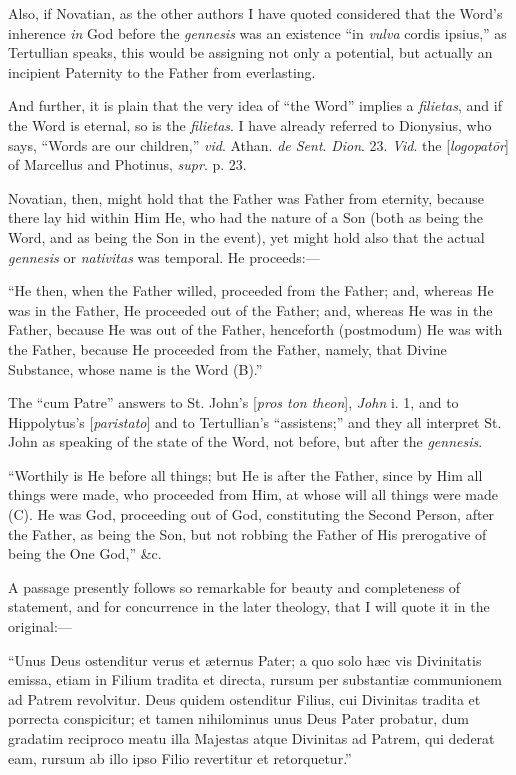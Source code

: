 Also, if Novatian, as the other authors I have quoted considered
that the Word's inherence \emph{in} God before the \emph{gennesis} was
an existence ``in \emph{vulva} cordis ipsius,'' as Tertullian
speaks, this would be assigning not only a potential, but actually an
incipient Paternity to the Father from everlasting.

And further, it is plain that the very idea of ``the Word''
implies a \emph{filietas}, and if the Word is eternal, so is the \emph{filietas}.
I have already referred to Dionysius, who says, ``Words are our
children,'' \emph{vid}. Athan. \emph{de Sent}. \emph{Dion}. 23. \emph{Vid}.
the [\emph{logopat\={o}r}] of Marcellus and Photinus, \emph{supr}.
p. 23.

Novatian, then, might hold that the Father was Father from
eternity, because there lay hid within Him He, who had the nature of a
Son (both as being the Word, and as being the Son in the event), yet
might hold also that the actual \emph{gennesis} or \emph{nativitas}
was temporal. He proceeds:—

``He then, when the Father willed, proceeded from the Father;
and, whereas He was in the Father, He proceeded out of the Father;
and, whereas He was in the Father, because He was out of the Father,
henceforth (postmodum) He was with the Father, because He proceeded
from the Father, namely, that Divine Substance, whose name is the Word
(B).''

The ``cum Patre'' answers to St. John's [\emph{pros ton theon}],
\emph{John} i. 1, and to Hippolytus's [\emph{paristato}] and to
Tertullian's ``assistens;'' and they all interpret St. John as
speaking of the state of the Word, not before, but after the \emph{gennesis}.

``Worthily is He before all things; but He is after the Father,
since by Him all things were made, who proceeded from Him, at whose
will all things were made (C). He was God, proceeding out of God,
constituting the Second Person, after the Father, as being the Son,
but not robbing the Father of His prerogative of being the One
God,'' \&c.

A passage presently follows so remarkable for beauty and
completeness of statement, and for concurrence in the later theology,
that I will quote it in the original:—

``Unus Deus ostenditur verus et æternus Pater; a quo solo hæc
vis Divinitatis emissa, etiam in Filium tradita et directa, rursum per
substantiæ communionem ad Patrem revolvitur. Deus quidem ostenditur
Filius, cui Divinitas tradita et porrecta conspicitur; et tamen
nihilominus unus Deus Pater probatur, dum gradatim reciproco meatu illa Majestas atque Divinitas ad Patrem, qui dederat eam, rursum
ab illo ipso Filio revertitur et retorquetur.''

